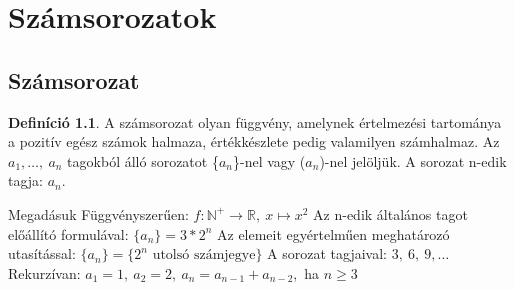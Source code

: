 \documentclass[twoside,12pt]{report}
\theoremstyle{definition}
\newtheorem{definition}[theorem]{Definíció}
\begin{document}
\chapter{Számsorozatok}
\section{Számsorozat}
	\begin{definition}
		A számsorozat olyan függvény, amelynek értelmezési tartománya a pozitív egész számok
		halmaza, értékkészlete pedig valamilyen számhalmaz. Az $a_1,\dots,\ a_n$ tagokból álló sorozatot \{$a_n$\}-nel vagy ($a_n$)-nel jelöljük. A sorozat n-edik tagja: $a_n$.
	\end{definition}
	\begin{outline}
		\1 Megadásuk
			\2 Függvényszerűen: $f:\mathbb{N}^+\longrightarrow\mathbb{R},\ x\mapsto x^2$
			\2 Az n-edik általános tagot előállító formulával: $\{a_n\}=3*2^n$
			\2 Az elemeit egyértelműen meghatározó utasítással: $\{a_n\}=\{2^n \text{ utolsó számjegye}\}$
			\2 A sorozat tagjaival: $3,\ 6,\ 9,\dots$
			\2 Rekurzívan: $a_1=1,\ a_2=2,\ a_n=a_{n-1}+a_{n-2},$ ha $n\ge3$
	\end{outline}
\end{document}
